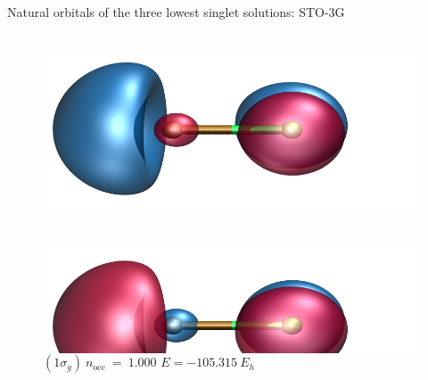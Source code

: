 \documentclass[10pt]{beamer}
\begin{document}
\begin{frame}{Natural orbitals of the three lowest singlet solutions:  STO-3G}
\begin{figure}
\begin{columns}[b]
      \begin{column}{0.31\textwidth}
        \includegraphics[height=0.6\textwidth]{Figures/lifr3_s2_mo7.cube.png}
        \caption*{\centering $(2\sigma_u)~n_\text{occ}~=~1.000$}
        \includegraphics[height=0.6\textwidth]{Figures/lifr3_s2_mo6.cube.png}
        \caption*{\centering $(1\sigma_g)~n_\text{occ}~=~1.000$
        $E=-105.315~E_h$}
      \end{column}

    \end{columns}
  \end{figure}
\end{frame}
\end{document}

